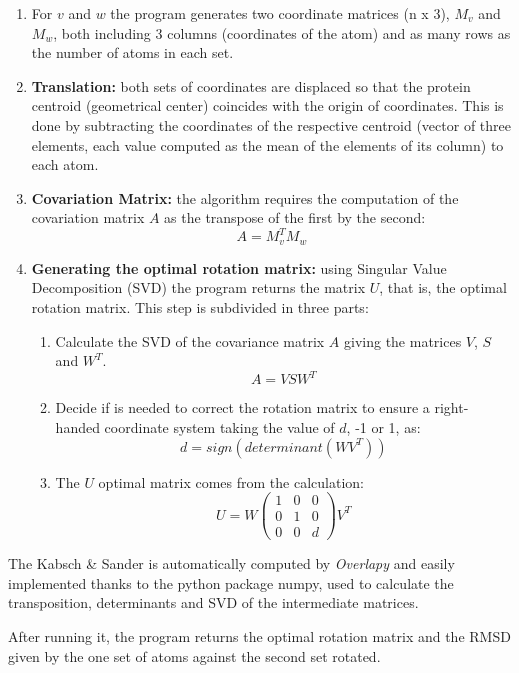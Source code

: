 \documentclass{article}
\begin{document}
\begin{enumerate}
	\item  For $v$ and $w$ the program generates two coordinate matrices (n x 3), $M_v$ and $M_w$, both including 3 columns (coordinates of the atom) and as many rows as the number of atoms in each set.
	\item \textbf{Translation:} both sets of coordinates are displaced so that the protein centroid (geometrical center) coincides with the origin of coordinates. This is done by subtracting the coordinates of the respective centroid (vector of three elements, each value computed as the mean of the elements of its column) to each atom.
	\item \textbf{Covariation Matrix:} the algorithm requires the computation of the covariation matrix $A$ as the transpose of the first by the second:
	$$A=M_{v}^{T} M_{w}$$
	\item \textbf{Generating the optimal rotation matrix:} using Singular Value Decomposition (SVD) the program returns the matrix $U$, that is, the optimal rotation matrix\cite{15}. This step is subdivided in three parts:
	\begin{enumerate}
		\item Calculate the SVD of the covariance matrix $A$ giving the matrices $V$, $S$ and $W^T$.
		$$A=VSW^T$$
		\item Decide if is needed to correct the rotation matrix to ensure a right-handed coordinate system taking the value of $d$, -1 or 1, as:
		$$ d = sign(determinant(WV^T))$$
		\item The $U$ optimal matrix comes from the calculation:
		\begin{equation*}
		    U = W\begin{pmatrix}
		        1 & 0 & 0\\
		        0 & 1 & 0\\
		        0 & 0 & d
		     \end{pmatrix} V^T
		\end{equation*}		
	\end{enumerate}
\end{enumerate}

The Kabsch \& Sander is automatically computed by \textit{Overlapy} and easily implemented thanks to the python package numpy\cite{16}, used to calculate the transposition, determinants and SVD of the intermediate matrices.

After running it, the program returns the optimal rotation matrix and the RMSD given by the one set of atoms against the second set rotated.
\end{document}
